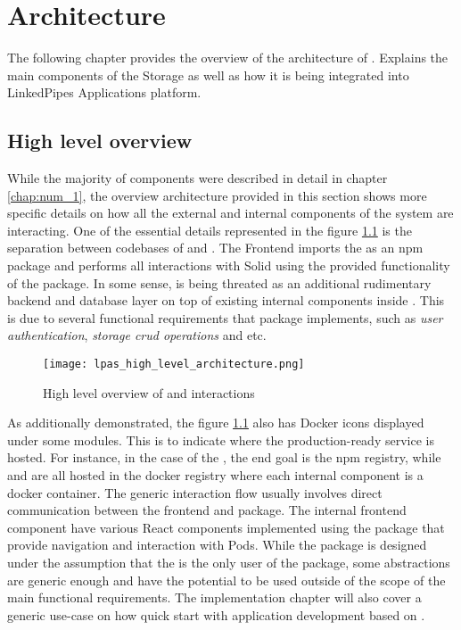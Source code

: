 \chapter{Architecture}
\label{chap:num_4}

The following chapter provides the overview of the architecture of \lpas. Explains the main components of the Storage as well as how it is being integrated into LinkedPipes Applications platform.

\section{High level overview}

While the majority of components were described in detail in chapter  \ref{chap:num_1}, the overview architecture provided in this section shows more specific details on how all the external and internal components of the system are interacting. One of the essential details represented in the figure \ref{fig:lpas_high_level_architecture} is the separation between codebases of \lpa{} and \lpas{}. The \lpa{} Frontend imports the \lpas{} as an npm package and performs all interactions with Solid using the provided functionality of the package. In some sense, \lpas{} is being threated as an additional rudimentary backend and database layer on top of existing internal components inside \lpa{}. This is due to several functional requirements that \lpas{} package implements,  such as \textit{user authentication}, \textit{storage crud operations}  and etc.

\begin{figure}[h]
\centering
\texttt{[image: lpas\_high\_level\_architecture.png]}
\caption{High level overview of \lpa{} and \lpas{} interactions}
\label{fig:lpas_high_level_architecture}
\end{figure}

As additionally demonstrated, the figure \ref{fig:lpas_high_level_architecture} also has Docker icons displayed under some modules. This is to indicate where the production-ready service is hosted. For instance, in the case of the \lpas{}, the end goal is the npm registry, while \lps{} and \lpa{} are all hosted in the docker registry where each internal component is a docker container.
The generic interaction flow usually involves direct communication between the \lpa{} frontend and \lpas{} package. The internal frontend component have various React components implemented using the \lpas{} package that provide navigation and interaction with \solid{} Pods. While the package is designed under the assumption that the \lpa{} is the only user of the package, some abstractions are generic enough and have the potential to be used outside of the scope of the main functional requirements. The implementation chapter will also cover a generic use-case on how quick start with application development based on \solid{}.

